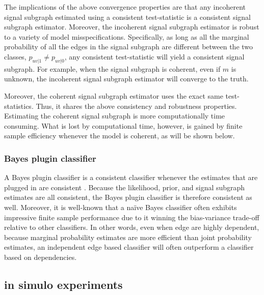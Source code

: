 \documentclass[10pt,journal,cspaper,compsoc]{IEEEtran}
\begin{document}
The implications of the above convergence properties are that any incoherent signal subgraph estimated using a consistent test-statistic is a consistent signal subgraph estimator.  Moreover, the incoherent signal subgraph estimator is robust to a variety of model misspecifications.  Specifically, as long as all the marginal probability of all the edges in the signal subgraph are different between the two classes, $p_{uv|1}\neq p_{uv|0}$, any consistent test-statistic will yield a consistent signal subgraph.  For example, when the signal subgraph is coherent, even if $m$ is unknown, the incoherent signal subgraph estimator will converge to the truth.

Moreover, the coherent signal subgraph estimator uses the exact same test-statistics.  Thus, it shares the above consistency and robustness properties.  Estimating the coherent signal subgraph is more computationally time consuming. What is lost by computational time, however, is gained by finite sample efficiency whenever the model is coherent, as will be shown below.


\subsubsection{Bayes plugin classifier}

A Bayes plugin classifier is a consistent classifier whenever the estimates that are plugged in are consistent \cite{}.  Because the likelihood, prior, and signal subgraph estimates are all consistent, the Bayes plugin classifier is therefore consistent as well.  Moreover, it is well-known that a na\"{i}ve Bayes classifier often exhibits impressive finite sample performance due to it winning the bias-variance trade-off relative to other classifiers.  In other words, even when edge are highly dependent, because marginal probability estimates are more efficient than joint probability estimates, an independent edge based classifier will often outperform a classifier based on dependencies.



\subsection{in simulo experiments} %
\label{sub:subsection_name}
\end{document}
